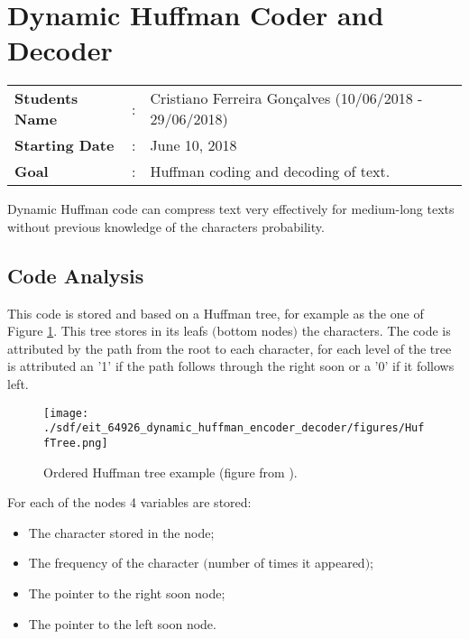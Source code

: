 
\clearpage
\section{Dynamic Huffman Coder and Decoder}

\begin{refsection}

\begin{tcolorbox}	
\begin{tabular}{p{2.75cm} p{0.2cm} p{10.5cm}} 	
\textbf{Students Name}  &:& Cristiano Ferreira Gon\c{c}alves (10/06/2018 - 29/06/2018) \\
\textbf{Starting Date} &:& June 10, 2018\\
\textbf{Goal}          &:& Huffman coding and decoding of text.
\end{tabular}
\end{tcolorbox}

Dynamic Huffman code can compress text very effectively for medium-long texts without previous knowledge of the characters probability.

\subsection{Code Analysis}

\hspace{5mm} This code is stored and based on a Huffman tree, for example as the one of Figure \ref{fig:hufftree}. This tree stores in its leafs $($bottom nodes$)$ the characters. The code is attributed by the path from the root to each character, for each level of the tree is attributed an '1' if the path follows through the right soon or a '0' if it follows left.

\begin{figure}[H]
	\centering
	\texttt{[image: ./sdf/eit\_64926\_dynamic\_huffman\_encoder\_decoder/figures/HuffTree.png]}
	\caption{Ordered Huffman tree example (figure from \cite{DigComm}).}\label{fig:hufftree}
\end{figure}

For each of the nodes 4 variables are stored:
\begin{itemize}
	\item The character stored in the node;
	\item The frequency of the character $($number of times it appeared$)$;
	\item The pointer to the right soon node;
	\item The pointer to the left soon node.
\end{itemize}
\vspace{2cm}


\end{refsection}
